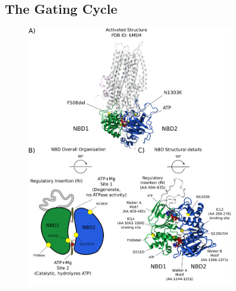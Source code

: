 
\subsection{The Gating Cycle}

\begin{figure}
	\begin{center}
	\includegraphics[width=0.8\textwidth]{figures/ATP_head_to_tail_figure.pdf}
	\end{center}
	\label{NBD_structure}
	\captionsetup{singlelinecheck = false, justification=raggedright}

\end{figure}
